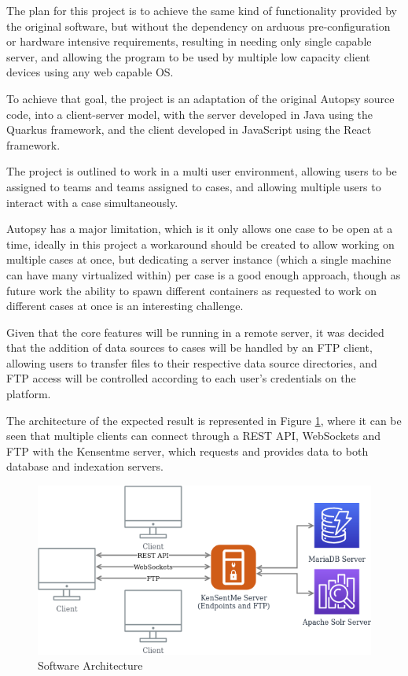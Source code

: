 The plan for this project is to achieve the same kind of functionality provided by the original software, but without the dependency on arduous pre-configuration
or hardware intensive requirements, resulting in needing only single capable server, and allowing the program to be used by multiple low capacity client devices using 
any web capable OS.

To achieve that goal, the project is an adaptation of the original Autopsy source code, into a client-server model, with the server developed in Java using the Quarkus \cite{quarkus} framework,
and the client developed in JavaScript using the React \cite{react} framework.

The project is outlined to work in a multi user environment, allowing users to be assigned to teams and teams assigned to cases, and allowing multiple users to interact with
a case simultaneously.

Autopsy has a major limitation, which is it only allows one case to be open at a time, ideally in this project a workaround should be created to allow working on multiple cases
at once, but dedicating a server instance (which a single machine can have many virtualized within) per case is a good enough approach, though as future work the
ability to spawn different containers as requested to work on different cases at once is an interesting challenge.

Given that the core features will be running in a remote server, it was decided that the addition of data sources to cases will be handled by an FTP client, allowing users
to transfer files to their respective data source directories, and FTP access will be controlled according to each user's credentials on the platform.

The architecture of the expected result is represented in Figure \ref{fig:arch}, where it can be seen that multiple clients can connect through a REST API, WebSockets and FTP with the Kensentme server, 
which requests and provides data to both database and indexation servers.

\begin{figure}[ht]
 \centering
 \includegraphics[width=0.75\linewidth]{imgs/arch.png}
 \caption{Software Architecture}
 \label{fig:arch}
\end{figure}

